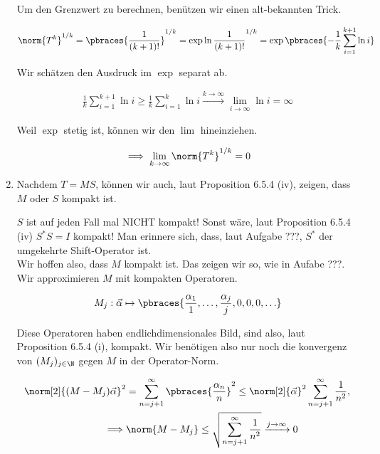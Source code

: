\begin{solution}
\begin{enumerate}[label = (\alph*)]
  Um den Grenzwert zu berechnen, benützen wir einen alt-bekannten Trick.

  \begin{align*}
    \norm{T^k}^{1/k}
    =
    \pbraces{\frac{1}{(k+1)!}}^{1/k}
    =
    \exp \ln \frac{1}{(k+1)!}^{1/k}
    =
    \exp \pbraces
    {
      -\frac{1}{k}
      \sum_{i=1}^{k+1}
      \ln{i}
    }
  \end{align*}


  Wir schätzen den Ausdruck im $\exp$ separat ab.

  \begin{align*}
    \frac{1}{k}
    \sum_{i=1}^{k+1}
    \ln{i}
    \geq
    \frac{1}{k}
    \sum_{i=1}^k
    \ln{i}
    \xrightarrow{k \to \infty}
    \lim_{i \to \infty}
    \ln{i}
    =
    \infty
  \end{align*}

  Weil $\exp$ stetig ist, können wir den $\lim$ hineinziehen.

  \begin{align*}
    \implies
    \lim_{k \to \infty}
    \norm{T^k}^{1/k}
    =
    0
  \end{align*}

  \item
  Nachdem $T = M S$, können wir auch, laut Proposition 6.5.4 (iv), zeigen, dass $M$ oder $S$ kompakt ist.


  $S$ ist auf jeden Fall mal NICHT kompakt!
  Sonst wäre, laut Proposition 6.5.4 (iv) $S^\ast S = I$ kompakt!
  Man erinnere sich, dass, laut Aufgabe ???, $S^\ast$ der umgekehrte Shift-Operator ist. \\

  Wir hoffen also, dass $M$ kompakt ist.
  Das zeigen wir so, wie in Aufabe ???.
  Wir approximieren $M$ mit kompakten Operatoren.

  \begin{align*}
    M_j:
    \vec \alpha
    \mapsto
    \pbraces
    {
      \frac{\alpha_1}{1},
      \ldots,
      \frac{\alpha_j}{j},
      0, 0, 0, \ldots
    }
  \end{align*}

  Diese Operatoren haben endlichdimensionales Bild, sind also, laut Proposition 6.5.4 (i), kompakt.
  Wir benötigen also nur noch die konvergenz von $(M_j)_{j \in \N}$ gegen $M$ in der Operator-Norm.

  \begin{align*}
    \norm[2]{(M - M_j) \vec \alpha}^2
    & =
    \sum_{n = j+1}^\infty
    \pbraces
    {
      \frac{\alpha_n}{n}
    }^2
    \leq
    \norm[2]{\vec \alpha}^2
    \sum_{n = j+1}^\infty
    \frac{1}{n^2}, \\
    \implies &
    \norm{M - M_j}
    \leq
    \sqrt
    {
      \sum_{n = j+1}^\infty
      \frac{1}{n^2}
    }
    \xrightarrow{j \to \infty} 0
  \end{align*}


\end{enumerate}
\end{solution}
